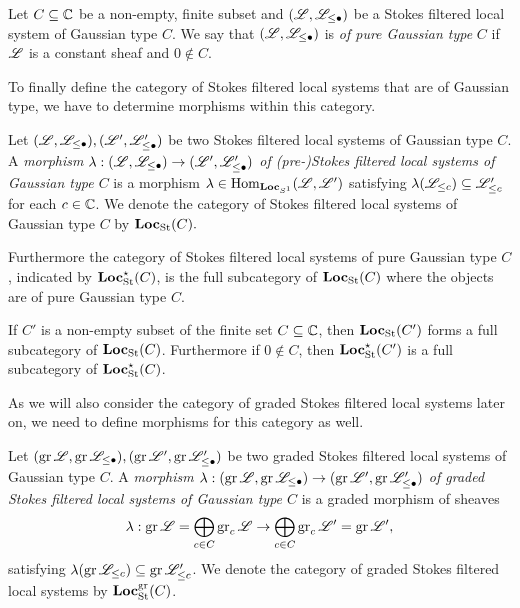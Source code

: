 \begin{defi}
    Let $C \subseteq \mathbb{C}$ be a non-empty, finite subset and $(\mathscr{L},\mathscr{L}_{\leq \bullet})$ be a Stokes filtered local system of Gaussian type $C$. We say that $(\mathscr{L},\mathscr{L}_{\leq \bullet})$ is \emph{of pure Gaussian type} $C$ if $\mathscr{L}$ is a constant sheaf and $0 \not\in C$.
\end{defi}

To finally define the category of Stokes filtered local systems that are of Gaussian type, we have to determine morphisms within this category.

\begin{defi}
Let $(\mathscr{L}, \mathscr{L}_{\leq \bullet}), (\mathscr{L}', \mathscr{L}'_{\leq \bullet})$ be two Stokes filtered local systems of Gaussian type $C$. A \emph{morphism $\lambda: (\mathscr{L}, \mathscr{L}_{\leq \bullet}) \to (\mathscr{L}', \mathscr{L}'_{\leq \bullet})$ of (pre-)Stokes filtered local systems of Gaussian type $C$} is a morphism $\lambda\in \operatorname{Hom}_{\mathbf{Loc}_{S^1}}(\mathscr{L}, \mathscr{L}')$ satisfying $\lambda(\mathscr{L}_{\leq c})\subseteq \mathscr{L}'_{\leq c}$ for each $c \in \mathbb{C}$. We denote the category of Stokes filtered local systems of Gaussian type $C$ by $\mathbf{Loc}_{\textrm{St}}(C).$

Furthermore the category of Stokes filtered local systems of pure Gaussian type $C$, indicated by $\mathbf{Loc}_{\textrm{St}}^\star(C)$, is the full subcategory of $\mathbf{Loc}_{\textrm{St}}(C)$ where the objects are of pure Gaussian type $C$.
\end{defi}

\begin{rem}
    If $C'$ is a non-empty subset of the finite set $C \subseteq \mathbb{C}$, then $\mathbf{Loc}_{\textrm{St}}(C')$ forms a full subcategory of $\mathbf{Loc}_{\textrm{St}}(C)$. Furthermore if $0 \not\in C$, then $\mathbf{Loc}_{\textrm{St}}^\star(C')$ is a full subcategory of $\mathbf{Loc}_{\textrm{St}}^\star(C)$.
\end{rem}

As we will also consider the category of graded Stokes filtered local systems later on, we need to define morphisms for this category as well.

\begin{defi}\label{gradedmorphism}
    Let $(\operatorname{gr}\mathscr{L}, \operatorname{gr}\mathscr{L}_{\leq \bullet}), (\operatorname{gr}\mathscr{L}', \operatorname{gr}\mathscr{L}_{\leq \bullet}')$ be two graded Stokes filtered local systems of Gaussian type $C$. A \emph{morphism $\lambda: (\operatorname{gr}\mathscr{L}, \operatorname{gr}\mathscr{L}_{\leq \bullet}) \to (\operatorname{gr}\mathscr{L}', \operatorname{gr}\mathscr{L}_{\leq \bullet}')$ of graded Stokes filtered local systems of Gaussian type $C$} is a graded morphism of sheaves \[\lambda: \operatorname{gr}\mathscr{L}=\bigoplus_{c\in C}\operatorname{gr}_c\mathscr{L} \to \bigoplus_{c \in C}\operatorname{gr}_c\mathscr{L}' = \operatorname{gr}\mathscr{L}',\] satisfying  $\lambda(\operatorname{gr}\mathscr{L}_{\leq c}) \subseteq \operatorname{gr}\mathscr{L}_{\leq c}'$. We denote the category of graded Stokes filtered local systems by $\mathbf{Loc}_{\textrm{St}}^{\operatorname{gr}}(C)$.
\end{defi}

